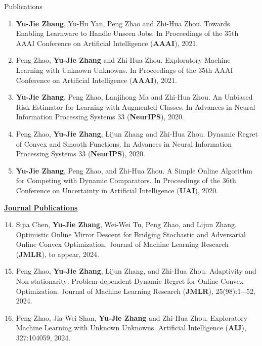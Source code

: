 \documentclass{resume} %
\begin{document}
\begin{rSection}{Publications}
\begin{enumerate}[leftmargin=0.2in]
	\item \textbf{Yu-Jie Zhang}, Yu-Hu Yan, Peng Zhao and Zhi-Hua Zhou. Towards Enabling Learnware to Handle Unseen Jobs. In {Proceedings of the 35th AAAI Conference on Artificial Intelligence} (\textbf{AAAI}), 2021.
	\item Peng Zhao, \textbf{Yu-Jie Zhang} and Zhi-Hua Zhou. Exploratory Machine Learning with Unknown Unknowns. In {Proceedings of the 35th AAAI Conference on Artificial Intelligence} (\textbf{AAAI}), 2021.
	\item \textbf{Yu-Jie Zhang}, Peng Zhao, Lanjihong Ma and Zhi-Hua Zhou. An Unbiased Risk Estimator for Learning with Augmented Classes. In {Advances in Neural Information Processing Systems 33} (\textbf{NeurIPS}), 2020.
	\item Peng Zhao, \textbf{Yu-Jie Zhang}, Lijun Zhang and Zhi-Hua Zhou. Dynamic Regret of Convex and Smooth Functions. In {Advances in Neural Information Processing Systems 33} (\textbf{NeurIPS}), 2020.
	\item \textbf{Yu-Jie Zhang}, Peng Zhao, and Zhi-Hua Zhou. A Simple Online Algorithm for Competing with Dynamic Comparators. In {Proceedings of the 36th Conference on Uncertainty in Artificial Intelligence} (\textbf{UAI}), 2020.
\end{enumerate}
\noindent \underline{\textbf{Journal Publications}}
\begin{enumerate}[leftmargin=0.2in]
	\setcounter{enumi}{13}
	\renewcommand*{\labelenumi}{[\theenumi]}
	\item Sijia Chen, \textbf{Yu-Jie Zhang}, Wei-Wei Tu, Peng Zhao, and Lijun Zhang. Optimistic Online Mirror Descent for Bridging Stochastic and Adversarial Online Convex Optimization. Journal of Machine Learning Research (\textbf{JMLR}), to appear, 2024.
	\item Peng Zhao, \textbf{Yu-Jie Zhang}, Lijun Zhang, and Zhi-Hua Zhou. Adaptivity and Non-stationarity: Problem-dependent Dynamic Regret for Online Convex Optimization. Journal of Machine Learning Research (\textbf{JMLR}), 25(98):1−52, 2024.
	\item Peng Zhao, Jia-Wei Shan, \textbf{Yu-Jie Zhang} and Zhi-Hua Zhou. Exploratory Machine Learning with Unknown Unknowns. Artificial Intelligence (\textbf{AIJ}), 327:104059, 2024.
\end{enumerate}
\end{rSection}

\end{document}
